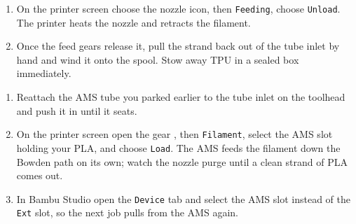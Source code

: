 

\begin{enumerate}[itemsep=2pt]
  \item On the printer screen choose the nozzle \iconnozzle{} icon, then
        \texttt{Feeding}, choose \texttt{Unload}. The printer heats the
        nozzle and retracts the filament.
  \item Once the feed gears release it,
  pull the strand back out of the tube inlet by hand and wind it
  onto the spool. Stow away TPU in a sealed box immediately.
\end{enumerate}

\begin{enumerate}[itemsep=2pt]
  \item Reattach the AMS tube you parked earlier to the tube inlet on the
        toolhead and push it in until it seats.
  \item On the printer screen open the gear \icongear{}, then
        \texttt{Filament}, select the AMS slot holding your PLA, and
        choose \texttt{Load}. The AMS feeds the filament down the Bowden
        path on its own; watch the nozzle purge until a clean strand of
        PLA comes out.
  \item In Bambu Studio open the \texttt{Device} tab and select the AMS
        slot instead of the \texttt{Ext} slot, so the next job pulls from
        the AMS again.
\end{enumerate}





